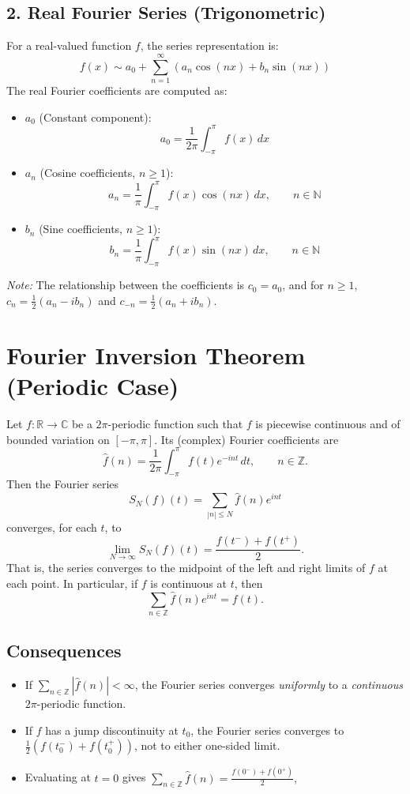 \documentclass[12pt]{article}
\begin{document}
\subsection*{2. Real Fourier Series (Trigonometric)}
For a real-valued function $f$, the series representation is:
\[
  f(x) \sim a_0 + \sum_{n=1}^{\infty} \left( a_n \cos(nx) + b_n \sin(nx) \right)
\]
The real Fourier coefficients are computed as:
\begin{itemize}
    \item $a_0$ (Constant component):
    \[
      a_0 = \frac{1}{2\pi}\int_{-\pi}^{\pi} f(x)\,dx
    \]
    \item $a_n$ (Cosine coefficients, $n \ge 1$):
    \[
      a_n = \frac{1}{\pi}\int_{-\pi}^{\pi} f(x) \cos(nx)\,dx, \qquad n\in\mathbb{N}
    \]
    \item $b_n$ (Sine coefficients, $n \ge 1$):
    \[
      b_n = \frac{1}{\pi}\int_{-\pi}^{\pi} f(x) \sin(nx)\,dx, \qquad n\in\mathbb{N}
    \]
\end{itemize}
\emph{Note:} The relationship between the coefficients is $c_0 = a_0$, and for $n \ge 1$, $c_n = \frac{1}{2}(a_n - ib_n)$ and $c_{-n} = \frac{1}{2}(a_n + ib_n)$.

\section*{Fourier Inversion Theorem (Periodic Case)}

Let $f : \mathbb{R} \to \mathbb{C}$ be a $2\pi$-periodic function such that $f$ is piecewise continuous and of bounded variation on $[-\pi,\pi]$.  
Its (complex) Fourier coefficients are
\[
\hat{f}(n) = \frac{1}{2\pi}\int_{-\pi}^{\pi} f(t)e^{-int}\,dt, \qquad n \in \mathbb{Z}.
\]
Then the Fourier series
\[
S_N(f)(t) = \sum_{|n|\le N}\hat{f}(n)e^{int}
\]
converges, for each $t$, to
\[
\lim_{N\to\infty}S_N(f)(t)
= \frac{f(t^-)+f(t^+)}{2}.
\]
That is, the series converges to the midpoint of the left and right limits of $f$ at each point.  
In particular, if $f$ is continuous at $t$, then
\[
\sum_{n\in\mathbb{Z}}\hat{f}(n)e^{int} = f(t).
\]

\subsection*{Consequences}

\begin{itemize}
  \item If $\displaystyle \sum_{n\in\mathbb{Z}} |\hat{f}(n)| < \infty$, the Fourier series converges \emph{uniformly} to a \emph{continuous} $2\pi$-periodic function.
  \item If $f$ has a jump discontinuity at $t_0$, the Fourier series converges to $\tfrac{1}{2}(f(t_0^-)+f(t_0^+))$, not to either one-sided limit.
  \item Evaluating at $t=0$ gives
  \(
    \sum_{n\in\mathbb{Z}}\hat{f}(n)
    = \frac{f(0^-)+f(0^+)}{2},
  \)
\end{itemize}
\end{document}
